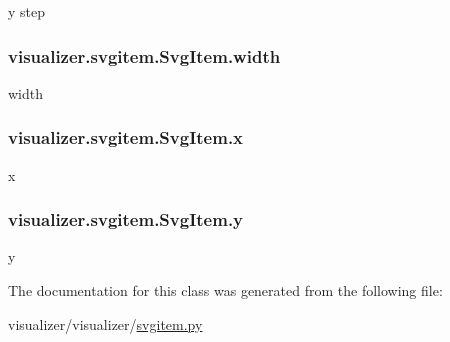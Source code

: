 y step 

\subsubsection[{\texorpdfstring{width}{width}}]{\setlength{\rightskip}{0pt plus 5cm}visualizer.\+svgitem.\+Svg\+Item.\+width}\hypertarget{classvisualizer_1_1svgitem_1_1SvgItem_a6576a5ad9cd06ff7670b143135eb1b9d}{}\label{classvisualizer_1_1svgitem_1_1SvgItem_a6576a5ad9cd06ff7670b143135eb1b9d}


width 

\subsubsection[{\texorpdfstring{x}{x}}]{\setlength{\rightskip}{0pt plus 5cm}visualizer.\+svgitem.\+Svg\+Item.\+x}\hypertarget{classvisualizer_1_1svgitem_1_1SvgItem_a2e9c288d8f56a32ef5e421f2a18da8d2}{}\label{classvisualizer_1_1svgitem_1_1SvgItem_a2e9c288d8f56a32ef5e421f2a18da8d2}


x 

\subsubsection[{\texorpdfstring{y}{y}}]{\setlength{\rightskip}{0pt plus 5cm}visualizer.\+svgitem.\+Svg\+Item.\+y}\hypertarget{classvisualizer_1_1svgitem_1_1SvgItem_aa578d8ef1d07a7489ba5e5ae3db9c999}{}\label{classvisualizer_1_1svgitem_1_1SvgItem_aa578d8ef1d07a7489ba5e5ae3db9c999}


y 



The documentation for this class was generated from the following file\+:\begin{DoxyCompactItemize}
\item 
visualizer/visualizer/\hyperlink{svgitem_8py}{svgitem.\+py}\end{DoxyCompactItemize}
